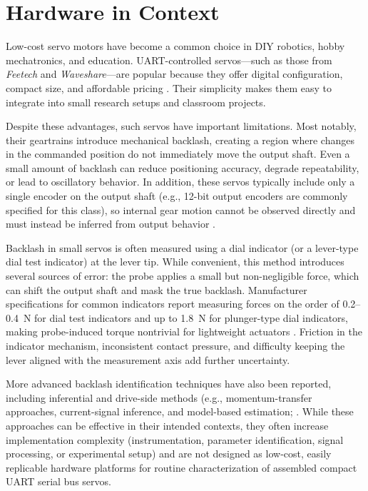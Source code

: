 \documentclass[11pt,letterpaper]{article}
\begin{document}
\section{Hardware in Context}
\label{sec:hardware-context}

Low-cost servo motors have become a common choice in DIY robotics, hobby mechatronics, and education.
UART-controlled servos---such as those from \textit{Feetech} and \textit{Waveshare}---are popular because they offer
digital configuration, compact size, and affordable pricing \cite{feetech_specification,waveshare_manual}.
Their simplicity makes them easy to integrate into small research setups and classroom projects.

Despite these advantages, such servos have important limitations. Most notably, their geartrains introduce
mechanical backlash, creating a region where changes in the commanded position do not immediately move the
output shaft. Even a small amount of backlash can reduce positioning accuracy, degrade repeatability, or lead
to oscillatory behavior. In addition, these servos typically include only a single encoder on the output shaft
(e.g., 12-bit output encoders are commonly specified for this class), so internal gear motion cannot be observed
directly and must instead be inferred from output behavior \cite{feetech_specification,waveshare_manual,feetech_specification_3250}.

Backlash in small servos is often measured using a dial indicator (or a lever-type dial test indicator) at the lever tip.
While convenient, this method introduces several sources of error: the probe applies a small but non-negligible force,
which can shift the output shaft and mask the true backlash. Manufacturer specifications for common indicators report
measuring forces on the order of 0.2--0.4~N for dial test indicators and up to 1.8~N for plunger-type dial indicators,
making probe-induced torque nontrivial for lightweight actuators \cite{mitutoyo_513,mitutoyo_3414s}.
Friction in the indicator mechanism, inconsistent contact pressure, and difficulty keeping the lever aligned with the
measurement axis add further uncertainty.

More advanced backlash identification techniques have also been reported, including inferential and drive-side methods (e.g., momentum-transfer approaches, current-signal inference,
and model-based estimation; \cite{backlash_measurement_methods,chandrasekar_measurement,yang_mcsa_backlash}. While these approaches can be effective in their intended contexts, they often increase implementation complexity (instrumentation, parameter identification, signal processing, or experimental setup) and are not designed as low-cost, easily replicable hardware platforms for routine characterization of assembled compact UART serial
bus servos.
\end{document}
